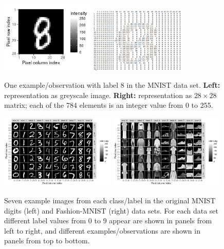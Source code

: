 \documentclass{article}
\begin{document}
\begin{figure}
  \centering
  \includegraphics[width=0.4\textwidth]{figure-fashion-mnist-one-example}
  \includegraphics[width=0.4\textwidth]{screenshot-8-matrix-values}
  \caption{One example/observation with label 8 in the MNIST data
  set. \textbf{Left:} representation as greyscale
  image. \textbf{Right:} representation as $28 \times 28$ matrix;
  each of the 784 elements is an integer value from 0 to 255.}
  \label{fig:mnist-one-example}
\end{figure}

\begin{figure}
  \centering
  \includegraphics[width=0.49\textwidth]{figure-fashion-mnist-digits}
  \includegraphics[width=0.49\textwidth]{figure-fashion-mnist-fashion}
  \caption{Seven example images from each class/label in the original MNIST digits
  (left) and Fashion-MNIST (right) data sets. For each data set
  different label values from 0 to 9 appear are shown in panels
  from left to right, and different examples/observations are
  shown in panels from top to bottom.} 
  \label{fig:fashion-mnist}
\end{figure}
\end{document}
